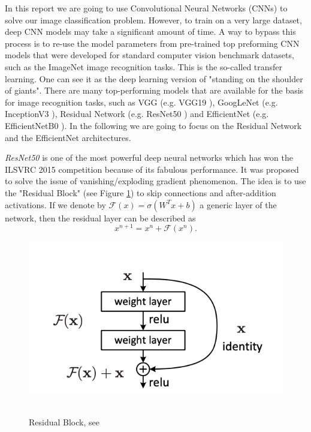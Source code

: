 \documentclass[11pt]{m2pi_v2}
\begin{document}
In this report we are going to use Convolutional Neural Networks (CNNs) to solve our image classification problem. However, to train on a very large dataset,  deep CNN models may take a significant amount of time.  A way to bypass this process is to re-use the model parameters from pre-trained top preforming CNN models that were developed for standard computer vision benchmark datasets, such as the ImageNet image recognition tasks. This is the so-called transfer learning. One can see it as  the deep learning version of  "standing on the shoulder of giants".
There are many top-performing models that are available for the basis for image recognition tasks, such as VGG (e.g. VGG19 \cite{simonyan2014very}), GoogLeNet (e.g. InceptionV3 \cite{szegedy2016rethinking}), Residual Network (e.g. ResNet50 \cite{he2016deep}) and EfficientNet (e.g. EfficientNetB0 \cite{tan2019efficientnet}). In the following we are going to focus on the Residual Network and the EfficientNet architectures.

\textit{ResNet50} \cite{he2016deep} is one of the most powerful deep neural networks which has won the ILSVRC 2015 competition because of its fabulous performance. It was proposed to solve the issue of vanishing/exploding gradient phenomenon. The idea is to use the "Residual Block"  (see Figure \ref{res}) to skip connections and after-addition activations. If we denote by $\mathcal{F}(x)=\sigma(W^Tx+b)$ a generic layer of the network, then the residual layer can be described as
\begin{equation}
x^{n+1}=x^n+\mathcal{F}(x^n).
\end{equation}
\begin{figure}
	\includegraphics[scale=0.3]{residual.png}\,
	\caption{Residual Block, see\cite{he2016deep}}\label{res}
\end{figure}
\end{document}
